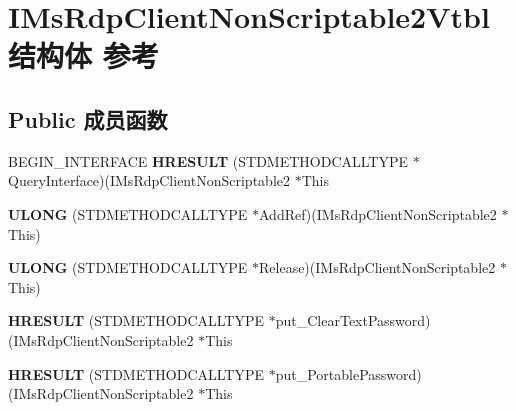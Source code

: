 \hypertarget{struct_i_ms_rdp_client_non_scriptable2_vtbl}{}\section{I\+Ms\+Rdp\+Client\+Non\+Scriptable2\+Vtbl结构体 参考}
\label{struct_i_ms_rdp_client_non_scriptable2_vtbl}
\subsection*{Public 成员函数}
\begin{DoxyCompactItemize}
\item 
\mbox{\label{struct_i_ms_rdp_client_non_scriptable2_vtbl_a36e6089272e73d7d3f4ba60a2628cd25}} 
B\+E\+G\+I\+N\+\_\+\+I\+N\+T\+E\+R\+F\+A\+CE {\bfseries H\+R\+E\+S\+U\+LT} (S\+T\+D\+M\+E\+T\+H\+O\+D\+C\+A\+L\+L\+T\+Y\+PE $\ast$Query\+Interface)(I\+Ms\+Rdp\+Client\+Non\+Scriptable2 $\ast$This
\item 
\mbox{\label{struct_i_ms_rdp_client_non_scriptable2_vtbl_a817da8b427e1fd148cf0e0e559675bb8}} 
{\bfseries U\+L\+O\+NG} (S\+T\+D\+M\+E\+T\+H\+O\+D\+C\+A\+L\+L\+T\+Y\+PE $\ast$Add\+Ref)(I\+Ms\+Rdp\+Client\+Non\+Scriptable2 $\ast$This)
\item 
\mbox{\label{struct_i_ms_rdp_client_non_scriptable2_vtbl_a4e96bfd2288140dd8f562e369f60f008}} 
{\bfseries U\+L\+O\+NG} (S\+T\+D\+M\+E\+T\+H\+O\+D\+C\+A\+L\+L\+T\+Y\+PE $\ast$Release)(I\+Ms\+Rdp\+Client\+Non\+Scriptable2 $\ast$This)
\item 
\mbox{\label{struct_i_ms_rdp_client_non_scriptable2_vtbl_aaee3232b123407de4556bb88d5ca31e0}} 
{\bfseries H\+R\+E\+S\+U\+LT} (S\+T\+D\+M\+E\+T\+H\+O\+D\+C\+A\+L\+L\+T\+Y\+PE $\ast$put\+\_\+\+Clear\+Text\+Password)(I\+Ms\+Rdp\+Client\+Non\+Scriptable2 $\ast$This
\item 
\mbox{\label{struct_i_ms_rdp_client_non_scriptable2_vtbl_a5dd3638c7e61b89e8e3d16a949b06082}} 
{\bfseries H\+R\+E\+S\+U\+LT} (S\+T\+D\+M\+E\+T\+H\+O\+D\+C\+A\+L\+L\+T\+Y\+PE $\ast$put\+\_\+\+Portable\+Password)(I\+Ms\+Rdp\+Client\+Non\+Scriptable2 $\ast$This

\end{DoxyCompactItemize}

